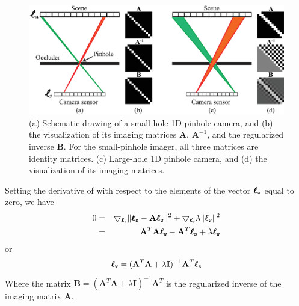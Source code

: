 \begin{figure}[t]
\centerline{
\includegraphics[width=1\linewidth]{figures/imaging/traditional_pinholes_2.eps}
}
\caption{
(a) Schematic drawing of a small-hole 1D pinhole camera, and (b) the visualization of its imaging matrices $\mathbf{A}$, $\mathbf{A}^{-1}$, and the regularized inverse $\mathbf{B}$.
For the small-pinhole imager, all three matrices are identity matrices.  
(c) Large-hole 1D pinhole camera, and (d) the visualization of its imaging matrices.}
\label{fig:amats1}
\end{figure}

Setting the derivative of \eqn{\ref{eq:posterior}} with respect to the elements of the vector $\boldsymbol\ell_{\texttt{w}}$ equal to zero, we have
\begin{eqnarray}
0 & = &  \bigtriangledown_{\boldsymbol\ell_{\texttt{w}}} \lVert \boldsymbol\ell_{\texttt{s}} - \mathbf{A} \boldsymbol\ell_{\texttt{w}} \rVert ^2 +  \bigtriangledown_{\boldsymbol\ell_{\texttt{w}}} \lambda \lVert \boldsymbol\ell_{\texttt{w}} \rVert ^2 \\
& = &  \mathbf{A}^T \mathbf{A} \boldsymbol\ell_{\texttt{w}} - \mathbf{A}^T \boldsymbol\ell_{\texttt{s}} + \lambda \boldsymbol\ell_{\texttt{w}} 
\label{eq:deriv}
\end{eqnarray}
or
\begin{equation}
 \boldsymbol\ell_{\texttt{w}} = (\mathbf{A}^T \mathbf{A} + \lambda \mathbf{I})^{-1} \mathbf{A}^T \boldsymbol\ell_{\texttt{s}} 
\label{eq:deriv2}
\end{equation}
Where the matrix $\mathbf{B}=(\mathbf{A}^T \mathbf{A} + \lambda \mathbf{I})^{-1} \mathbf{A}^T$ is the regularized inverse of the imaging matrix $\mathbf{A}$.


